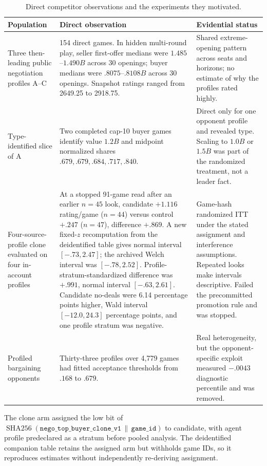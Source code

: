 \begin{table}[h]
\centering
\small
\caption{Direct competitor observations and the experiments they motivated.}
\label{tab:competitors}
\begin{tabularx}{\linewidth}{@{}p{2.65cm}p{4.35cm}Y@{}}
\toprule
Population & Direct observation & Evidential status \\
\midrule
Three then-leading public negotiation profiles A--C & 154 direct games. In hidden multi-round play, seller first-offer medians were $1.485$--$1.490B$ across 30 openings; buyer medians were $.8075$--$.8108B$ across 30 openings. Snapshot ratings ranged from 2649.25 to 2918.75. & Shared extreme-opening pattern across seats and horizons; no estimate of why the profiles rated highly. \\
Type-identified slice of A & Two completed cap-10 buyer games identify value $1.2B$ and midpoint normalized shares $.679,.679,.684,.717,.840$. & Direct only for one opponent profile and revealed type. Scaling to $1.0B$ or $1.5B$ was part of the randomized treatment, not a leader fact. \\
Four-source-profile clone evaluated on four in-account profiles & At a stopped 91-game read after an earlier $n=45$ look, candidate $+1.116$ rating/game ($n=44$) versus control $+.247$ ($n=47$), difference $+.869$. A new fixed-$z$ recomputation from the deidentified table gives normal interval $[-.73,2.47]$; the archived Welch interval was $[-.78,2.52]$. Profile-stratum-standardized difference was $+.991$, normal interval $[-.63,2.61]$. Candidate no-deals were 6.14 percentage points higher, Wald interval $[-12.0,24.3]$ percentage points, and one profile stratum was negative. & Game-hash randomized ITT under the stated assignment and interference assumptions. Repeated looks make intervals descriptive. Failed the precommitted promotion rule and was stopped. \\
Profiled bargaining opponents & Thirty-three profiles over 4,779 games had fitted acceptance thresholds from $.168$ to $.679$. & Real heterogeneity, but the opponent-specific exploit measured $-.0043$ diagnostic percentile and was removed. \\
\bottomrule
\end{tabularx}
\end{table}

The clone arm assigned the low bit of
$\operatorname{SHA256}(\texttt{nego\_top\_buyer\_clone\_v1}\,\|\,\texttt{game\_id})$
to candidate, with agent profile predeclared as a stratum before pooled analysis. The
deidentified companion table retains the assigned arm but withholds game IDs, so it
reproduces estimates without independently re-deriving assignment.

